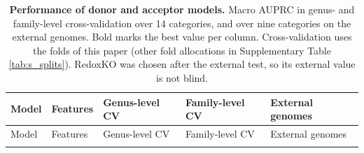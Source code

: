\documentclass[10pt,a4paper,onecolumn]{article}
\begin{document}
\begin{longtable}[]{@{}
  >{\raggedright\arraybackslash}p{}
  >{\raggedright\arraybackslash}p{}
  >{\raggedleft\arraybackslash}p{}
  >{\raggedleft\arraybackslash}p{}
  >{\raggedleft\arraybackslash}p{}@{}}
\caption{\textbf{Performance of donor and acceptor models.} Macro AUPRC
in genus- and family-level cross-validation over 14 categories, and over
nine categories on the external genomes. Bold marks the best value per
column. Cross-validation uses the folds of this paper (other fold
allocations in Supplementary Table \ref{tab:s_splits}). RedoxKO was
chosen after the external test, so its external value is not blind.
\label{tab:cv}}\tabularnewline
\toprule\noalign{}
\begin{minipage}[b]{\linewidth}\raggedright
Model
\end{minipage} & \begin{minipage}[b]{\linewidth}\raggedright
Features
\end{minipage} & \begin{minipage}[b]{\linewidth}\raggedleft
Genus-level CV
\end{minipage} & \begin{minipage}[b]{\linewidth}\raggedleft
Family-level CV
\end{minipage} & \begin{minipage}[b]{\linewidth}\raggedleft
External genomes
\end{minipage} \\
\midrule\noalign{}
\endfirsthead
\toprule\noalign{}
\begin{minipage}[b]{\linewidth}\raggedright
Model
\end{minipage} & \begin{minipage}[b]{\linewidth}\raggedright
Features
\end{minipage} & \begin{minipage}[b]{\linewidth}\raggedleft
Genus-level CV
\end{minipage} & \begin{minipage}[b]{\linewidth}\raggedleft
Family-level CV
\end{minipage} & \begin{minipage}[b]{\linewidth}\raggedleft
External genomes
\end{minipage} \\
\midrule\noalign{}

\end{longtable}
\end{document}
